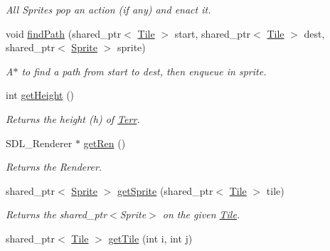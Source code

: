 \begin{DoxyCompactItemize}
\begin{DoxyCompactList}\small\item\em All Sprites pop an action (if any) and enact it. \end{DoxyCompactList}\item 
void \hyperlink{class_terr_ad0596843b8e4c1ddd9b39220837b88ce}{find\+Path} (shared\+\_\+ptr$<$ \hyperlink{class_tile}{Tile} $>$ start, shared\+\_\+ptr$<$ \hyperlink{class_tile}{Tile} $>$ dest, shared\+\_\+ptr$<$ \hyperlink{class_sprite}{Sprite} $>$ sprite)\hypertarget{class_terr_ad0596843b8e4c1ddd9b39220837b88ce}{}\label{class_terr_ad0596843b8e4c1ddd9b39220837b88ce}

\begin{DoxyCompactList}\small\item\em A$\ast$ to find a path from start to dest, then enqueue in sprite. \end{DoxyCompactList}\item 
int \hyperlink{class_terr_a0ef7c8147e12a2291fc84d9ebc67a8df}{get\+Height} ()\hypertarget{class_terr_a0ef7c8147e12a2291fc84d9ebc67a8df}{}\label{class_terr_a0ef7c8147e12a2291fc84d9ebc67a8df}

\begin{DoxyCompactList}\small\item\em Returns the height (h) of \hyperlink{class_terr}{Terr}. \end{DoxyCompactList}\item 
S\+D\+L\+\_\+\+Renderer $\ast$ \hyperlink{class_terr_a85a154825a89e15d9a94292106782438}{get\+Ren} ()\hypertarget{class_terr_a85a154825a89e15d9a94292106782438}{}\label{class_terr_a85a154825a89e15d9a94292106782438}

\begin{DoxyCompactList}\small\item\em Returns the Renderer. \end{DoxyCompactList}\item 
shared\+\_\+ptr$<$ \hyperlink{class_sprite}{Sprite} $>$ \hyperlink{class_terr_abd52d806d98279c1b5e25949acf14b33}{get\+Sprite} (shared\+\_\+ptr$<$ \hyperlink{class_tile}{Tile} $>$ tile)\hypertarget{class_terr_abd52d806d98279c1b5e25949acf14b33}{}\label{class_terr_abd52d806d98279c1b5e25949acf14b33}

\begin{DoxyCompactList}\small\item\em Returns the shared\+\_\+ptr$<$\+Sprite$>$ on the given \hyperlink{class_tile}{Tile}. \end{DoxyCompactList}\item 
shared\+\_\+ptr$<$ \hyperlink{class_tile}{Tile} $>$ \hyperlink{class_terr_aac1903a210962f56187208297c8de12f}{get\+Tile} (int i, int j)\hypertarget{class_terr_aac1903a210962f56187208297c8de12f}{}\label{class_terr_aac1903a210962f56187208297c8de12f}


\end{DoxyCompactItemize}
